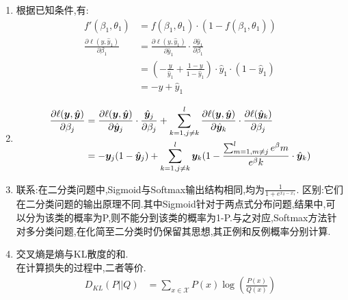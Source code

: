 \documentclass[answers]{exam}  %
\begin{document}
\begin{questions}
\begin{enumerate}
    \end{enumerate}


    \begin{solution}
        \begin{enumerate}
            \item 根据已知条件,有:
                  \begin{align*}
                      f'(\beta_1,\theta_1)                                 & =f(\beta_1,\theta_1)\cdot (1-f(\beta_1,\theta_1))                                                        \\
                      \frac{\partial \ell (y,\hat{y}_1)}{\partial \beta_1} & =\frac{\partial \ell (y,\hat{y}_1)}{\partial \hat{y}_1}\cdot \frac{\partial \hat{y}_1}{\partial \beta_1} \\
                                                                           & =(-\frac{y}{\hat{y}_1}+\frac{1-y}{1-\hat{y}_1})\cdot \hat{y}_1\cdot (1-\hat{y}_1)                        \\
                                                                           & =-y+\hat{y}_1
                  \end{align*}
            \item
                  \begin{align*}
                      \frac{\partial \ell (\boldsymbol{y},\hat{\boldsymbol{y}})}{\partial \beta_j} & = \frac{\partial \ell (\boldsymbol{y},\hat{\boldsymbol{y}})}{\partial \hat{\boldsymbol{y}}_j}\cdot \frac{\hat{\boldsymbol{y}}_j}{\partial \beta_j}+\sum_{k=1,j\neq k}^{l}\frac{\partial \ell (\boldsymbol{y},\hat{\boldsymbol{y}})}{\partial \hat{\boldsymbol{y}}_k} \cdot \frac{\partial \ell (\hat{\boldsymbol{y}}_k)}{\partial \beta_j} \\
                                                                             & =-\boldsymbol{y}_j(1-\hat{\boldsymbol{y}}_j)+\sum_{k=1,j\neq k}^l \boldsymbol{y}_k(1-\frac{\sum_{m=1,m\neq j}^{l}e^\beta m}{e^\beta k}\cdot \hat{\boldsymbol{y}}_k )
                  \end{align*}
            \item 联系:在二分类问题中,Sigmoid与Softmax输出结构相同,均为$\frac{1}{1+e^{x_2-x_1}} $.
                  区别:它们在二分类问题的输出原理不同.其中Sigmoid针对于两点式分布问题,结果中,可以分为该类的概率为P,则不能分到该类的概率为1-P.与之对应,Softmax方法针对多分类问题,在化简至二分类时仍保留其思想,其正例和反例概率分别计算.
            \item 交叉熵是熵与KL散度的和.\\
                  在计算损失的过程中,二者等价.
                  \begin{align*}
                      D_{KL}(P||Q) & =\sum_{x\in \mathcal{X}}P(x)\log(\frac{P(x)}{Q(x)} )                       \\

\end{align*}
\end{enumerate}
\end{solution}
\end{questions}
\end{document}
